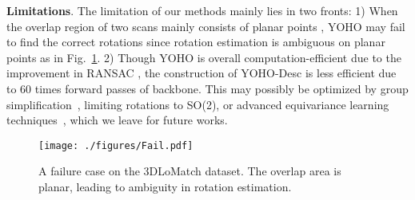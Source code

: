 \begin{table}[]\footnotesize
\renewcommand{\arraystretch}{1.02}\begin{center}
\end{center}
\caption{The time consumption for the registration on the 3DMatch dataset and the 3DLoMatch dataset. We provide the time $t_1$ used in the feature extraction of one point cloud fragment and the time $t_2$ in aligning a point cloud pair, and the total time $T$ on the registration of the 3DMatch and the 3DLoMatch dataset.}
\label{tab:time_new}
\vspace{-25pt}
\end{table}


\textbf{Limitations}. 
The limitation of our methods mainly lies in two fronts: 1) When the overlap region of two scans mainly consists of planar points
, YOHO may fail to find the correct rotations since rotation estimation is ambiguous on planar points as in Fig.~\ref{fig:fail}.
2) Though YOHO is overall computation-efficient due to 
the improvement in RANSAC 
, the construction of YOHO-Desc is less efficient due to 60 times forward passes of backbone. 
This may possibly be optimized by group simplification~\cite{EMVN}, limiting rotations to SO(2), or advanced equivariance learning techniques~\cite{VN,tensorfield}, which we leave for future works.



\begin{figure}
\begin{center}
\texttt{[image: ./figures/Fail.pdf]}
\vspace{-10pt}
\end{center}
   \caption{A failure case on the 3DLoMatch dataset. The overlap area is planar, leading to ambiguity in rotation estimation.}
\label{fig:fail}
\vspace{-10pt}
\end{figure}

